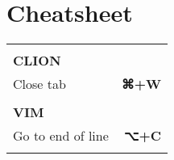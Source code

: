 \documentclass[9pt,a4paper,landscape,draft,sans]{scrartcl}
\makeatletter
\newcommand\Cmd{{\xits ⌘}}
\newcommand\Ctl{^}
\newcommand\Opt{{\xits ⌥}}
\newcommand\Sft{{\xits ⇧}}
\newcommand\Tab{{\xits ⇥}}
\newcommand\Bsp{{\xits ⌫}}
\newcommand\Ent{{\xits ↵}}
\let\mcnewpage=\newpage
\newcommand{\TrickSupertabularIntoMulticols}{
  \renewcommand\newpage{
    \if@firstcolumn
      \hrule width\linewidth height0pt
      \columnbreak
    \else
      \mcnewpage
    \fi
  }
}
\newcommand{\theader}[1]{
    \rule{0pt}{6ex} \\
    \textbf{\uppercase{#1}} & \\
    \noalign{\global\arrayrulewidth=1.5pt}
    \hline
}
\newcommand{\tshortcut}[2]{
    #1 & \textbf{#2} \\
    \noalign{\global\arrayrulewidth=0.5pt}
    \hline
}
\makeatother
\begin{document}
\section*{Cheatsheet}
\begin{multicols}{3}

\TrickSupertabularIntoMulticols
\begin{supertabular}{@{}p{5cm}r@{}}
    \theader{CLion}
    \tshortcut{Close tab}{\Cmd+W}
    \theader{Vim}
    \tshortcut{Go to end of line}{\Opt+C}
\end{supertabular}

\end{multicols}
\end{document}
